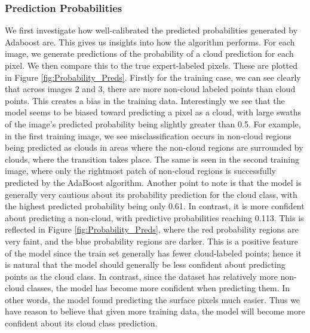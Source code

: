 \documentclass[11pt, letterpaper, journal]{IEEEtran}
\begin{document}
\subsubsection{Prediction Probabilities}
We first investigate how well-calibrated the predicted probabilities generated by Adaboost are. This gives us insights into how the algorithm performs. For each image, we generate predictions of the probability of a cloud prediction for each pixel. We then compare this to the true expert-labeled pixels. These are plotted in Figure \ref{fig:Probability_Preds}. Firstly for the training case, we can see clearly that across images 2 and 3, there are more non-cloud labeled points than cloud points. This creates a bias in the training data. Interestingly we see that the model seems to be biased toward predicting a pixel as a cloud, with large swaths of the image's predicted probability being slightly greater than 0.5. For example, in the first training image, we see misclassification occurs in non-cloud regions being predicted as clouds in areas where the non-cloud regions are surrounded by clouds, where the transition takes place. The same is seen in the second training image, where only the rightmost patch of non-cloud regions is successfully predicted by the AdaBoost algorithm. Another point to note is that the model is generally very cautious about its probability prediction for the cloud class, with the highest predicted probability being only 0.61. In contrast, it is more confident about predicting a non-cloud, with predictive probabilities reaching 0.113. This is reflected in Figure \ref{fig:Probability_Preds}, where the red probability regions are very faint, and the blue probability regions are darker. This is a positive feature of the model since the train set generally has fewer cloud-labeled points; hence it is natural that the model should generally be less confident about predicting points as the cloud class. In contrast, since the dataset has relatively more non-cloud classes, the model has become more confident when predicting them. In other words, the model found predicting the surface pixels much easier. Thus we have reason to believe that given more training data, the model will become more confident about its cloud class prediction.
\end{document}
